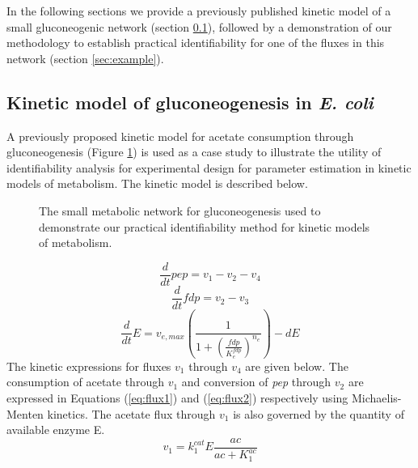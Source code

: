 \documentclass[10pt]{article}
\begin{document}
	In the following sections we provide a previously published kinetic model of a small gluconeogenic network (section \ref{sec:small-model}), followed by a demonstration of our methodology to establish practical identifiability for one of the fluxes in this network (section \ref{sec:example}).
	
	\subsection{Kinetic model of gluconeogenesis in \textit{E. coli}}\label{sec:small-model}
	A previously proposed kinetic model \parencite{Kotte2014, Srinivasan2017} for acetate consumption through gluconeogenesis (Figure \ref{fig:network}) is used as a case study to illustrate the utility of identifiability analysis for experimental design for parameter estimation in kinetic models of metabolism. The kinetic model is described below.
	\begin{figure}[!tbhp]
		\caption{The small metabolic network for gluconeogenesis used to demonstrate our practical identifiability method for kinetic models of metabolism.}\label{fig:network}
	\end{figure}	
	\begin{equation}\label{eq:ode1}
	\frac{d}{dt}pep=v_1-v_2-v_4
	\end{equation}
	\begin{equation}\label{eq:ode2}
	\frac{d}{dt}fdp=v_2-v_3
	\end{equation}
	\begin{equation}\label{eq:ode3}
	\frac{d}{dt}E=v_{e,max}\left(\frac{1}{1+\left(\frac{fdp}{K_{e}^{fdp}}\right)^{n_e}}\right) - d E
	\end{equation}
	The kinetic expressions for fluxes $v_1$ through $v_4$ are given below. The consumption of acetate through $v_1$ and conversion of \textit{pep} through $v_2$ are expressed in Equations (\ref{eq:flux1}) and (\ref{eq:flux2}) respectively using Michaelis-Menten kinetics. The acetate flux through $v_1$ is also governed by the quantity of available enzyme E. 
	\begin{equation}\label{eq:flux1}
	v_1 = k_{1}^{cat}E\frac{ac}{ac+K_{1}^{ac}}
	\end{equation}	
\end{document}
